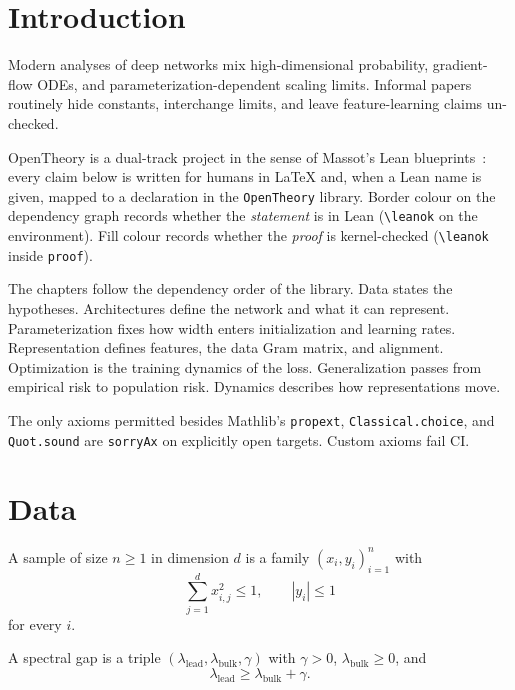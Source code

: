 \chapter{Introduction}

Modern analyses of deep networks mix high-dimensional probability, gradient-flow ODEs, and parameterization-dependent scaling limits. Informal papers routinely hide constants, interchange limits, and leave feature-learning claims un-checked.

OpenTheory is a dual-track project in the sense of Massot's Lean blueprints~\cite{tao2023pfr}: every claim below is written for humans in \LaTeX{} and, when a Lean name is given, mapped to a declaration in the \texttt{OpenTheory} library. Border colour on the dependency graph records whether the \emph{statement} is in Lean (\texttt{\textbackslash leanok} on the environment). Fill colour records whether the \emph{proof} is kernel-checked (\texttt{\textbackslash leanok} inside \texttt{proof}).

The chapters follow the dependency order of the library. Data states the hypotheses. Architectures define the network and what it can represent. Parameterization fixes how width enters initialization and learning rates. Representation defines features, the data Gram matrix, and alignment. Optimization is the training dynamics of the loss. Generalization passes from empirical risk to population risk. Dynamics describes how representations move.

The only axioms permitted besides Mathlib's \texttt{propext}, \texttt{Classical.choice}, and \texttt{Quot.sound} are \texttt{sorryAx} on explicitly open targets. Custom axioms fail CI.

\chapter{Data}

\begin{definition}\label{def:sample}
\leanok
A sample of size $n\ge 1$ in dimension $d$ is a family $(x_i,y_i)_{i=1}^n$ with
\[
\sum_{j=1}^d x_{i,j}^2 \le 1, \qquad |y_i|\le 1
\]
for every $i$.
\end{definition}

\begin{definition}\label{def:spectral_gap}
\leanok
A spectral gap is a triple $(\lambda_{\mathrm{lead}},\lambda_{\mathrm{bulk}},\gamma)$ with $\gamma>0$, $\lambda_{\mathrm{bulk}}\ge 0$, and
\[
\lambda_{\mathrm{lead}} \ge \lambda_{\mathrm{bulk}} + \gamma.
\]
\end{definition}

